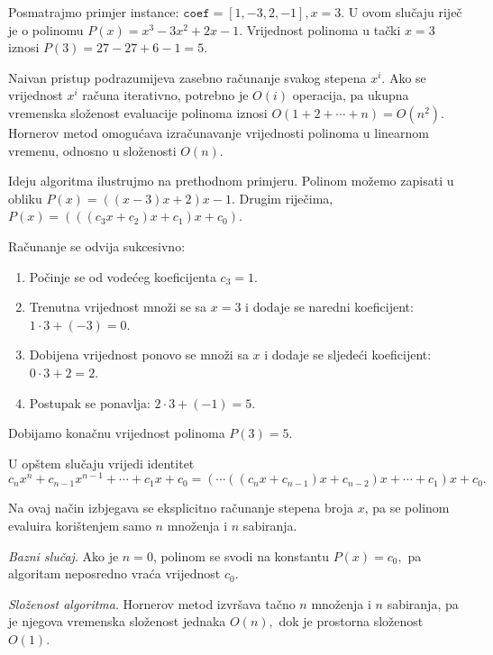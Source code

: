  \begin{solution}
 	
 	Posmatrajmo primjer instance: $\texttt{coef}=[1,-3,2,-1], x=3.$ U ovom slučaju riječ je o polinomu $
 	P(x)=x^3-3x^2+2x-1.$ Vrijednost polinoma u tački $x=3$ iznosi $P(3)=27-27+6-1=5.$
 	
 	\medskip
 	
 	Naivan pristup podrazumijeva zasebno računanje svakog stepena $x^i$. Ako se vrijednost $x^i$ računa iterativno, potrebno je $O(i)$ operacija, pa ukupna vremenska složenost evaluacije polinoma iznosi $
 	O(1+2+\cdots+n)=O(n^2).$  	Hornerov metod omogućava izračunavanje vrijednosti polinoma u linearnom vremenu, odnosno u složenosti $O(n)$.
 	
 	Ideju algoritma ilustrujmo na prethodnom primjeru. Polinom možemo zapisati u obliku $P(x)=((x-3)x+2)x-1.$ Drugim riječima, $P(x)=(((c_3x+c_2)x+c_1)x+c_0).$
 	
 	Računanje se odvija sukcesivno:
 	
 	\begin{enumerate}
 		\item Počinje se od vodećeg koeficijenta $c_3=1$.
 		\item Trenutna vrijednost množi se sa $x=3$ i dodaje se naredni koeficijent: $1\cdot 3+(-3)=0.$
 		\item Dobijena vrijednost ponovo se množi sa $x$ i dodaje se sljedeći koeficijent: $ 0\cdot 3+2=2.$
 		\item Postupak se ponavlja: $2 \cdot 3+(-1)=5.$
 	\end{enumerate}
 	
 	Dobijamo konačnu vrijednost polinoma $	P(3)=5.$
 	
 	\medskip
 	
 	U opštem slučaju vrijedi identitet $$
 	c_nx^n+c_{n-1}x^{n-1}+\cdots+c_1x+c_0
 	=(\cdots((c_nx+c_{n-1})x+c_{n-2})x+\cdots+c_1)x+c_0.
 	$$
 	
 	Na ovaj način izbjegava se eksplicitno računanje stepena broja $x$, pa se polinom evaluira korištenjem samo $n$ množenja i $n$ sabiranja.
 	
 	\medskip
 	
 	\textit{Bazni slučaj}. Ako je $n=0$, polinom se svodi na konstantu $	P(x)=c_0,$ 	pa algoritam neposredno vraća vrijednost $c_0$.
 	
 	\medskip
 	
 	\textit{Složenost algoritma}. Hornerov metod izvršava tačno $n$ množenja i $n$ sabiranja, pa je njegova vremenska složenost jednaka $
 	O(n),$	dok je prostorna složenost $O(1)$.
 \end{solution}
 
